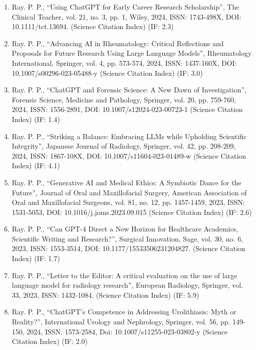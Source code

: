 \documentclass[11pt,a4paper]{moderncv}
\begin{document}
\begin{adjustwidth}{6em}{0pt}
\begin{enumerate}
		\item Ray. P. P., “Using ChatGPT for Early Career Research Scholarship”, The Clinical Teacher, vol. 21, no. 3, pp. 1, Wiley, 2024, ISSN: 1743-498X, DOI: 10.1111/tct.13694. (Science Citation Index) (IF: 2.3)
		
		\item Ray. P. P., “Advancing AI in Rheumatology: Critical Reflections and Proposals for Future Research Using Large Language Models”, Rheumatology International, Springer, vol. 4, pp. 573-574, 2024, ISSN: 1437-160X, DOI: 10.1007/s00296-023-05488-y (Science Citation Index) (IF: 3.0)
		
		\item Ray. P. P., “ChatGPT and Forensic Science: A New Dawn of Investigation”, Forensic Science, Medicine and Pathology, Springer, vol. 20, pp. 759-760, 2024, ISSN: 1556-2891, DOI: 10.1007/s12024-023-00723-1 (Science Citation Index) (IF: 1.4)
		
		\item Ray. P. P., “Striking a Balance: Embracing LLMs while Upholding Scientific Integrity”, Japanese Journal of Radiology, Springer, vol. 42, pp. 208-209, 2024, ISSN: 1867-108X, DOI: 10.1007/s11604-023-01489-w (Science Citation Index) (IF: 4.1)
		
		\item Ray. P. P., “Generative AI and Medical Ethics: A Symbiotic Dance for the Future”, Journal of Oral and Maxillofacial Surgery, American Association of Oral and Maxillofacial Surgeons, vol. 81, no. 12, pp. 1457-1459, 2023, ISSN: 1531-5053, DOI: 10.1016/j.joms.2023.09.015 (Science Citation Index) (IF: 2.6)
		
		\item Ray. P. P., “Can GPT-4 Direct a New Horizon for Healthcare Academics, Scientific Writing and Research?”, Surgical Innovation, Sage, vol. 30, no. 6, 2023, ISSN: 1553-3514, DOI: 10.1177/15533506231204827. (Science Citation Index) (IF: 1.7)
		
		\item Ray. P. P., “Letter to the Editor: A critical evaluation on the use of large language model for radiology research”, European Radiology, Springer, vol. 33, 2023, ISSN: 1432-1084. (Science Citation Index) (IF: 5.9)
		
		\item Ray. P. P., “ChatGPT’s Competence in Addressing Urolithiasis: Myth or Reality?”, International Urology and Nephrology, Springer, vol. 56, pp. 149-150, 2024, ISSN: 1573-2584, Doi: 10.1007/s11255-023-03802-y (Science Citation Index) (IF: 2.0)
		

\end{enumerate}
\end{adjustwidth}
\end{document}
